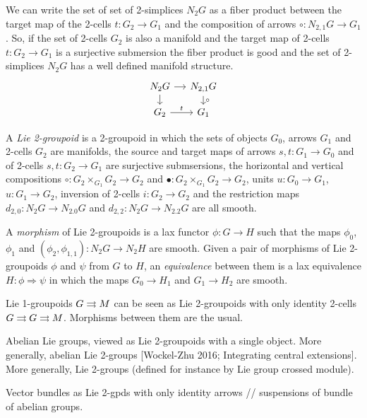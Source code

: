 We can write the set of set of 2-simplices $N_2G$ as a fiber product between the target map of the 2-cells $t\colon G_2\to G_1$ and the composition of arrows $\circ\colon N_{2,1}G\to G_1$.
So, if the set of 2-cells $G_2$ is also a manifold and the target map of 2-cells $t\colon G_2\to G_1$ is a surjective submersion the fiber product  is good and the set of 2-simplices $N_2G$ has a well defined manifold structure.
\begin{equation}
  \begin{tikzcd}[sep = small]
    N_2G \ar{r} \ar{d} & N_{2,1}G \ar{d}{\circ} \\
    G_2 \ar{r}{t} & G_1
  \end{tikzcd}
\end{equation}

A \emph{Lie 2-groupoid} is a 2-groupoid in which the sets of objects $G_0$, arrows $G_1$ and 2-cells $G_2$ are manifolds, the source and target maps of arrows $s,t\colon G_1\to G_0$ and of 2-cells $s,t\colon G_2\to G_1$ are surjective submsersions, the horizontal and vertical compositions $\circ\colon G_2\times_{G_1} G_2\to G_2$ and $\bullet\colon G_2\times_{G_1} G_2\to G_2$, units $u\colon G_0\to G_1$, $u\colon G_1\to G_2$, inversion of 2-cells $i\colon G_2\to G_2$ and the restriction maps $d_{2,0}\colon N_2G\to N_{2.0}G$ and $d_{2,2}\colon N_2G\to N_{2.2}G$ are all smooth.

A \emph{morphism} of Lie 2-groupoids is a lax functor $\phi\colon G\to H$ such that the maps $\phi_0$, $\phi_1$ and $(\phi_2,\phi_{1,1})\colon N_2G\to N_2H$ are smooth.
Given a pair of morphisms of Lie 2-groupoids $\phi$ and $\psi$ from $G$ to $H$, an \emph{equivalence} between them is a lax equivalence $H\colon\phi\Rightarrow\psi$ in which the maps $G_0\to H_1$ and $G_1\to H_2$ are smooth.

\begin{example}
Lie 1-groupoids $G\rightrightarrows M$ can be seen as Lie 2-groupoids with only identity 2-cells $G\rightrightarrows G\rightrightarrows M$. Morphisms between them are the usual.
\end{example}

\begin{example}
Abelian Lie groups, viewed as Lie 2-groupoids with a single object. More generally, abelian Lie 2-groups [Wockel-Zhu 2016; Integrating central extensions]. More generally, Lie 2-groups (defined for instance by Lie group crossed module).
\end{example}

\begin{example}
Vector bundles as Lie 2-gpds with only identity arrows // suspensions of bundle of abelian groups.
\end{example}

